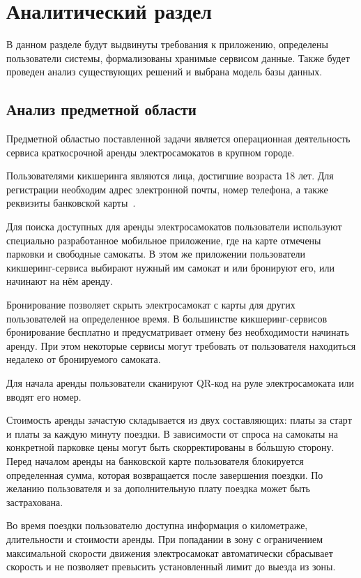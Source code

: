 \chapter{Аналитический раздел}

В данном разделе будут выдвинуты требования к приложению, определены пользователи системы, формализованы хранимые сервисом данные. Также будет проведен анализ существующих решений и выбрана модель базы данных.

\section{Анализ предметной области}

Предметной областью поставленной задачи является операционная деятельность сервиса краткосрочной аренды электросамокатов в крупном городе. 

Пользователями кикшеринга являются лица, достигшие возраста 18 лет. Для регистрации необходим адрес электронной почты, номер телефона, а также реквизиты банковской карты~\cite{whoosh-reqs}.

Для поиска доступных для аренды электросамокатов пользователи используют специально разработанное мобильное приложение, где на карте отмечены парковки и свободные самокаты. В этом же приложении пользователи кикшеринг-сервиса выбирают нужный им самокат и или бронируют его, или начинают на нём аренду.

Бронирование позволяет скрыть электросамокат с карты для других пользователей на определенное время. В большинстве кикшеринг-сервисов бронирование бесплатно и предусматривает отмену без необходимости начинать аренду. При этом некоторые сервисы могут требовать от пользователя находиться недалеко от бронируемого самоката.

Для начала аренды пользователи сканируют QR-код на руле электросамоката или вводят его номер.

Стоимость аренды зачастую складывается из двух составляющих: платы за старт и платы за каждую минуту поездки. В зависимости от спроса на самокаты на конкретной парковке цены могут быть скорректированы в б\'{о}льшую сторону. Перед началом аренды на банковской карте пользователя блокируется определенная сумма, которая возвращается после завершения поездки. По желанию пользователя и за дополнительную плату поездка может быть застрахована. 

Во время поездки пользователю доступна информация о километраже, длительности и стоимости аренды. При попадании в зону с ограничением максимальной скорости движения электросамокат автоматически сбрасывает скорость и не позволяет превысить установленный лимит до выезда из зоны.

